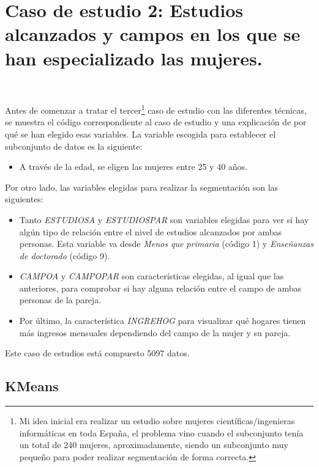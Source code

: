 \documentclass[paper=a4, fontsize=12pt]{article} %
\numberwithin{equation}{section} %
\numberwithin{figure}{section} %
\numberwithin{table}{section} %
\begin{document}
\section{Caso de estudio 2: Estudios alcanzados y campos en los que se han especializado las mujeres.}

\begin{figure}[H]
    \centering
    \mbox {
    }
\end{figure}

Antes de comenzar a tratar el tercer\footnote{Mi idea inicial era realizar un estudio sobre mujeres científicas/ingenieras informáticas en toda España, el problema vino cuando el subconjunto tenía un total de 240 mujeres, aproximadamente, siendo un subconjunto muy pequeño para poder realizar segmentación de forma correcta.} caso de estudio con las diferentes técnicas, se muestra el código correspondiente al caso de estudio y una explicación de por qué se han elegido esas variables. La variable escogida para establecer el subconjunto de datos es la siguiente:
\begin{itemize}
\item A través de la edad, se eligen las mujeres entre 25 y 40 años.
\end{itemize}

Por otro lado, las variables elegidas para realizar la segmentación son las siguientes:
\begin{itemize}
\item Tanto \textit{ESTUDIOSA} y \textit{ESTUDIOSPAR} son variables elegidas para ver si hay algún tipo de relación entre el nivel de estudios alcanzados por ambas personas. Esta variable va desde \textit{Menos que primaria} (código 1) y \textit{Enseñanzas de doctorado} (código 9).
\item \textit{CAMPOA} y \textit{CAMPOPAR} son características elegidas, al igual que las anteriores, para comprobar si hay alguna relación entre el campo de ambas personas de la pareja.
\item Por último, la característica \textit{INGREHOG} para visualizar qué hogares tienen más ingresos mensuales dependiendo del campo de la mujer y su pareja.
\end{itemize}

Este caso de estudios está compuesto 5097 datos.

\subsection{KMeans}
\end{document}
